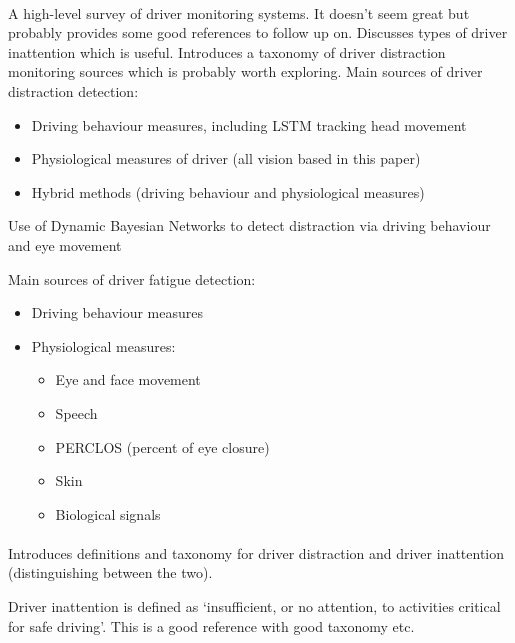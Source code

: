 \documentclass[11pt, parskip=half*,twoside=false]{scrbook}
\begin{document}
\paragraph{\citep{koesdwiadyRecentTrendsDriver2017}} A high-level survey of driver monitoring systems. It doesn't seem great but probably provides some good references to follow up on. Discusses types of driver inattention which is useful. Introduces a taxonomy of driver distraction monitoring sources which is probably worth exploring. Main sources of driver distraction detection:
\begin{itemize}
	\item Driving behaviour measures, including LSTM tracking head movement \citep{wollmerOnlineDriverDistraction2011}
	\item Physiological measures of driver (all vision based in this paper)
	\item Hybrid methods (driving behaviour and physiological measures)
\end{itemize}

Use of Dynamic Bayesian Networks to detect distraction via driving behaviour and eye movement \citep{liangHybridBayesianNetwork2014}

Main sources of driver fatigue detection:
\begin{itemize}
	\item Driving behaviour measures
	\item Physiological measures:
	\begin{itemize}
		\item Eye and face movement
		\item Speech
		\item PERCLOS (percent of eye closure)
		\item Skin \citep{kurianDrowsinessDetectionUsing2014a}
		\item Biological signals \citep{zhangAutomatedDetectionDriver2014}
	\end{itemize}
\end{itemize}

\paragraph{\citep{reganDriverDistractionDriver2011}} Introduces definitions and taxonomy for driver distraction and driver inattention (distinguishing between the two).

Driver inattention is defined as `insufficient, or no attention, to activities critical for safe driving'. This is a good reference with good taxonomy etc.
\end{document}
